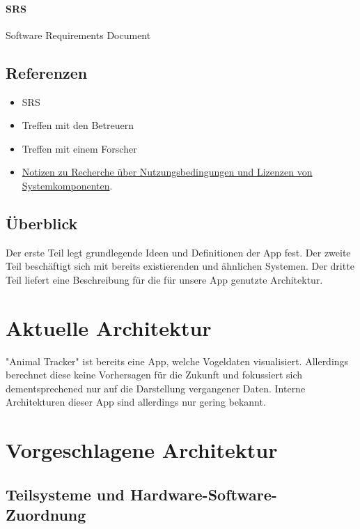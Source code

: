 \documentclass[12pt]{article} %
\begin{document}
	\paragraph{SRS} Software Requirements Document



\subsection{Referenzen}
\begin{itemize}
	\item SRS
	\item Treffen mit den Betreuern
	\item Treffen mit einem Forscher
	\item \href{https://git.uni-konstanz.de/kn/swp2018/group12/tree/master/Dokumentation/Lizenzen}{Notizen zu Recherche über Nutzungsbedingungen und Lizenzen von Systemkomponenten}.
\end{itemize}


\subsection{Überblick}

Der erste Teil legt grundlegende Ideen und Definitionen der App fest. Der zweite Teil beschäftigt sich mit bereits existierenden und ähnlichen Systemen. Der dritte Teil liefert eine Beschreibung für die für unsere App genutzte Architektur.  





\section{Aktuelle Architektur}

"Animal Tracker" ist bereits eine App, welche Vogeldaten visualisiert. Allerdings berechnet diese keine Vorhersagen für die Zukunft und fokussiert sich dementsprechened nur auf die Darstellung vergangener Daten. Interne Architekturen dieser App sind allerdings nur gering bekannt.


\section{Vorgeschlagene Architektur}



\subsection{Teilsysteme und Hardware-Software-Zuordnung}
\end{document}
